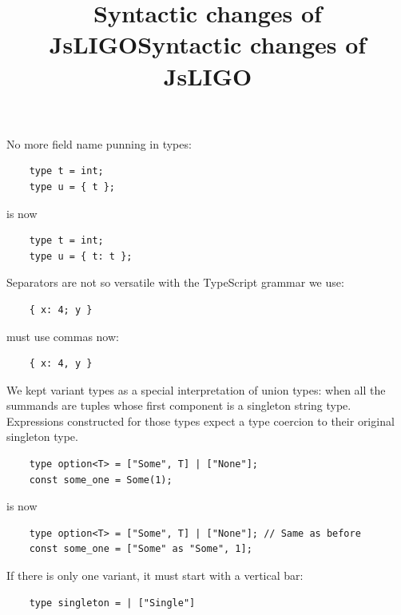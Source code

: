 \documentclass[wide]{slides}
\newcommand{\TypeScript}[0]{\textsf{TypeScript}}
\begin{document}
\begin{slide}
  \title{Syntactic changes of JsLIGO}

  No more field name punning in types:
  \begin{lstlisting}
    type t = int;
    type u = { t };
  \end{lstlisting}
  is now
  \begin{lstlisting}
    type t = int;
    type u = { t: t };
  \end{lstlisting}

  Separators are not so versatile with the \TypeScript{} grammar we
  use:
  \begin{lstlisting}
    { x: 4; y }
  \end{lstlisting}
  must use commas now:
  \begin{lstlisting}
    { x: 4, y }
  \end{lstlisting}

\end{slide}

\begin{slide}
  \title{Syntactic changes of JsLIGO}

  We kept variant types as a special interpretation of union types:
  when all the summands are tuples whose first component is a
  singleton string type. Expressions constructed for those types
  expect a type coercion to their original singleton type.
  \begin{lstlisting}
    type option<T> = ["Some", T] | ["None"];
    const some_one = Some(1);
  \end{lstlisting}
  is now
  \begin{lstlisting}
    type option<T> = ["Some", T] | ["None"]; // Same as before
    const some_one = ["Some" as "Some", 1];
  \end{lstlisting}
  If there is only one variant, it must start with a vertical bar:
  \begin{lstlisting}
    type singleton = | ["Single"]
  \end{lstlisting}

\end{slide}
\end{document}
